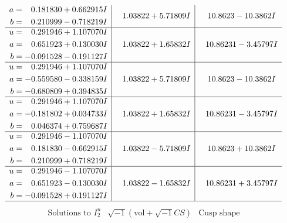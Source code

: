 \documentclass[1p]{elsarticle_modified}
\theoremstyle{definition}
\newcommand{\I}{\sqrt{-1}}
\begin{document}
$$\begin{array}{c|c|c}
\begin{aligned}
a &= \phantom{-}0.181830 + 0.662915 I \\
b &= \phantom{-}0.210999 - 0.718219 I\end{aligned}
 & \phantom{-}1.03822 + 5.71809 I & \phantom{-}10.8623 - 10.3862 I \\ \hline\begin{aligned}
u &= \phantom{-}0.291946 + 1.107070 I \\
a &= \phantom{-}0.651923 + 0.130030 I \\
b &= -0.091528 - 0.191127 I\end{aligned}
 & \phantom{-}1.03822 + 1.65832 I & \phantom{-}10.86231 - 3.45797 I \\ \hline\begin{aligned}
u &= \phantom{-}0.291946 + 1.107070 I \\
a &= -0.559580 - 0.338159 I \\
b &= -0.680809 + 0.394835 I\end{aligned}
 & \phantom{-}1.03822 + 5.71809 I & \phantom{-}10.8623 - 10.3862 I \\ \hline\begin{aligned}
u &= \phantom{-}0.291946 + 1.107070 I \\
a &= -0.181802 + 0.034733 I \\
b &= \phantom{-}0.046374 + 0.759687 I\end{aligned}
 & \phantom{-}1.03822 + 1.65832 I & \phantom{-}10.86231 - 3.45797 I \\ \hline\begin{aligned}
u &= \phantom{-}0.291946 - 1.107070 I \\
a &= \phantom{-}0.181830 - 0.662915 I \\
b &= \phantom{-}0.210999 + 0.718219 I\end{aligned}
 & \phantom{-}1.03822 - 5.71809 I & \phantom{-}10.8623 + 10.3862 I \\ \hline\begin{aligned}
u &= \phantom{-}0.291946 - 1.107070 I \\
a &= \phantom{-}0.651923 - 0.130030 I \\
b &= -0.091528 + 0.191127 I\end{aligned}
 & \phantom{-}1.03822 - 1.65832 I & \phantom{-}10.86231 + 3.45797 I\\
 \hline 
 \end{array}$$\newpage$$\begin{array}{c|c|c}  
\text{Solutions to }I^u_{2}& \I (\text{vol} + \sqrt{-1}CS) & \text{Cusp shape}\\

\end{array}$$
\end{document}
